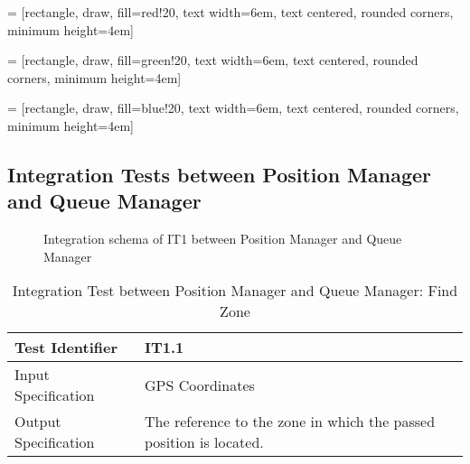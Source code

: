 \documentclass[a4paper]{article}
\begin{document}
 = [rectangle, draw, fill=red!20, 
    text width=6em, text centered, rounded corners, minimum height=4em]

 = [rectangle, draw, fill=green!20, 
    text width=6em, text centered, rounded corners, minimum height=4em]
    
 = [rectangle, draw, fill=blue!20, 
    text width=6em, text centered, rounded corners, minimum height=4em]

\renewcommand{\arraystretch}{1.25}

\newlength{\leftcol}
\setlength{\leftcol}{.3\textwidth}

\newlength{\rightcol}
\setlength{\rightcol}{.6\textwidth}


\subsection{Integration Tests between Position Manager and Queue Manager}

\begin{figure}[H]
\caption{Integration schema of IT1 between Position Manager and Queue Manager}
\end{figure}

\begin{table} [H]
\begin{center}
\begin{tabular}{| L | p{\rightcol} |}
  \hline
  Test Identifier & IT1.1 \\
  \hline
  Input Specification & GPS Coordinates\\
  \hline
  Output Specification & The reference to the zone in which the passed position is located.\\
  \hline
\end{tabular}
\end{center}
\caption{Integration Test between Position Manager and Queue Manager: Find Zone}
\end{table}
\end{document}
